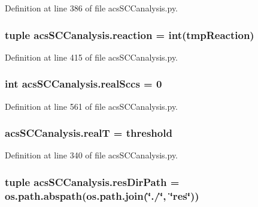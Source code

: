 Definition at line 386 of file acs\-S\-C\-Canalysis.\-py.

\hypertarget{a00097_a58c3618ec28f27dfbf09e0d3aba05bc7}{
\subsubsection[{reaction}]{\setlength{\rightskip}{0pt plus 5cm}tuple acs\-S\-C\-Canalysis.\-reaction = int(tmp\-Reaction)}}\label{a00097_a58c3618ec28f27dfbf09e0d3aba05bc7}


Definition at line 415 of file acs\-S\-C\-Canalysis.\-py.

\hypertarget{a00097_ac6aaa0ac5d13b0736ab3179dc1ed388d}{
\subsubsection[{real\-Sccs}]{\setlength{\rightskip}{0pt plus 5cm}int acs\-S\-C\-Canalysis.\-real\-Sccs = 0}}\label{a00097_ac6aaa0ac5d13b0736ab3179dc1ed388d}


Definition at line 561 of file acs\-S\-C\-Canalysis.\-py.

\hypertarget{a00097_a1c9b45f6074222ace96b7ab38cb8e23b}{
\subsubsection[{real\-T}]{\setlength{\rightskip}{0pt plus 5cm}acs\-S\-C\-Canalysis.\-real\-T = {\bf threshold}}}\label{a00097_a1c9b45f6074222ace96b7ab38cb8e23b}


Definition at line 340 of file acs\-S\-C\-Canalysis.\-py.

\hypertarget{a00097_a9ededb3cd7c63befde39ad68e5f9e006}{
\subsubsection[{res\-Dir\-Path}]{\setlength{\rightskip}{0pt plus 5cm}tuple acs\-S\-C\-Canalysis.\-res\-Dir\-Path = os.\-path.\-abspath(os.\-path.\-join(\char`\"{}./\char`\"{}, \char`\"{}res\char`\"{}))}}\label{a00097_a9ededb3cd7c63befde39ad68e5f9e006}


